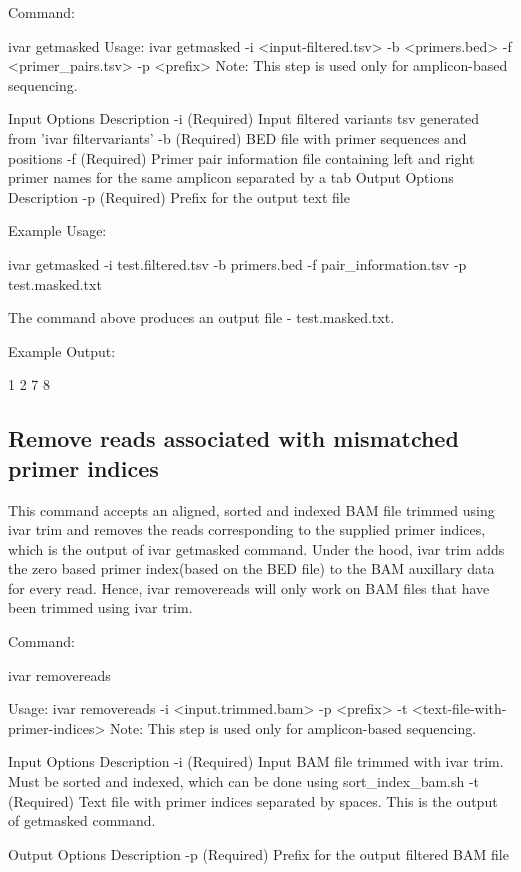 Command\+: 
\begin{DoxyCode}
ivar getmasked
Usage: ivar getmasked -i <input-filtered.tsv> -b <primers.bed> -f <primer\_pairs.tsv> -p <prefix>
Note: This step is used only for amplicon-based sequencing.

Input Options    Description
           -i    (Required) Input filtered variants tsv generated from 'ivar filtervariants'
           -b    (Required) BED file with primer sequences and positions
           -f    (Required) Primer pair information file containing left and right primer names for the
       same amplicon separated by a tab
Output Options   Description
           -p    (Required) Prefix for the output text file
\end{DoxyCode}


Example Usage\+: 
\begin{DoxyCode}
ivar getmasked -i test.filtered.tsv -b primers.bed -f pair\_information.tsv -p test.masked.txt
\end{DoxyCode}


The command above produces an output file -\/ test.\+masked.\+txt.

Example Output\+:


\begin{DoxyCode}
1 2 7 8
\end{DoxyCode}
\hypertarget{manualpage_autotoc_md19}{}\subsection{Remove reads associated with mismatched primer indices}\label{manualpage_autotoc_md19}
This command accepts an aligned, sorted and indexed B\+AM file trimmed using {\ttfamily ivar trim} and removes the reads corresponding to the supplied primer indices, which is the output of {\ttfamily ivar getmasked} command. Under the hood, {\ttfamily ivar trim} adds the zero based primer index(based on the B\+E\+D file) to the B\+AM auxillary data for every read. Hence, ivar removereads will only work on B\+AM files that have been trimmed using {\ttfamily ivar trim}.

Command\+: 
\begin{DoxyCode}
ivar removereads

Usage: ivar removereads -i <input.trimmed.bam> -p <prefix> -t <text-file-with-primer-indices>
Note: This step is used only for amplicon-based sequencing.

Input Options    Description
           -i    (Required) Input BAM file  trimmed with ivar trim. Must be sorted and indexed, which can
       be done using sort\_index\_bam.sh
           -t    (Required) Text file with primer indices separated by spaces. This is the output of
       getmasked command.

Output Options   Description
           -p    (Required) Prefix for the output filtered BAM file
\end{DoxyCode}


